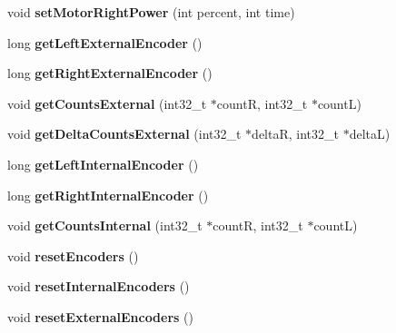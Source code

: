 \begin{DoxyCompactItemize}
void {\bfseries set\+Motor\+Right\+Power} (int percent, int time)
\item 
\mbox{\label{classAsservDriver_aa6924c9da7428d59fa712c15221dfbac}} 
long {\bfseries get\+Left\+External\+Encoder} ()
\item 
\mbox{\label{classAsservDriver_afda042c513d96188f8572899679cc616}} 
long {\bfseries get\+Right\+External\+Encoder} ()
\item 
\mbox{\label{classAsservDriver_a40d638a52c2ef3c2e98fe4ffa9a7bfe9}} 
void {\bfseries get\+Counts\+External} (int32\+\_\+t $\ast$countR, int32\+\_\+t $\ast$countL)
\item 
\mbox{\label{classAsservDriver_a588e61ea789b256d73fd04b1f7a840b5}} 
void {\bfseries get\+Delta\+Counts\+External} (int32\+\_\+t $\ast$deltaR, int32\+\_\+t $\ast$deltaL)
\item 
\mbox{\label{classAsservDriver_a01959c5fd48ed61fedfb22a6c3605ea2}} 
long {\bfseries get\+Left\+Internal\+Encoder} ()
\item 
\mbox{\label{classAsservDriver_a00e162296e20e589d7117b2427908aa6}} 
long {\bfseries get\+Right\+Internal\+Encoder} ()
\item 
\mbox{\label{classAsservDriver_a643c154d40a2842293fcbf433dc73ee1}} 
void {\bfseries get\+Counts\+Internal} (int32\+\_\+t $\ast$countR, int32\+\_\+t $\ast$countL)
\item 
\mbox{\label{classAsservDriver_a1d4095fd5abc9597f5aa35fc4d02f3fa}} 
void {\bfseries reset\+Encoders} ()
\item 
\mbox{\label{classAsservDriver_a9375c998721a68c0fcdd1c538642fdc6}} 
void {\bfseries reset\+Internal\+Encoders} ()
\item 
\mbox{\label{classAsservDriver_a62108360983265520b0401a71f810f6a}} 
void {\bfseries reset\+External\+Encoders} ()
\item 
\mbox{\label{classAsservDriver_a69fb8c78d0ced7bd7f330c18952c84f4}} 

\end{DoxyCompactItemize}
